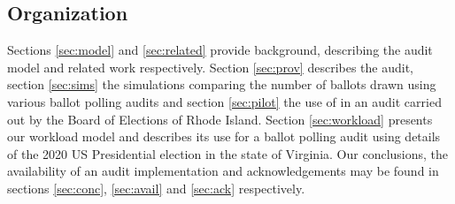 \subsection{Organization} 
Sections \ref{sec:model} and \ref{sec:related} provide background, describing the audit model and related work respectively. Section \ref{sec:prov} describes the \Providence audit, section \ref{sec:sims} the simulations comparing the number of ballots drawn using various ballot polling audits and section \ref{sec:pilot} the use of \Providence in an audit carried out by the Board of Elections of Rhode Island. Section \ref{sec:workload} presents our workload model and describes its use for a ballot polling audit using details of the 2020 US Presidential election in the state of Virginia. Our conclusions, the availability of an audit implementation and acknowledgements may be found in sections \ref{sec:conc}, \ref{sec:avail} and \ref{sec:ack} respectively. 

